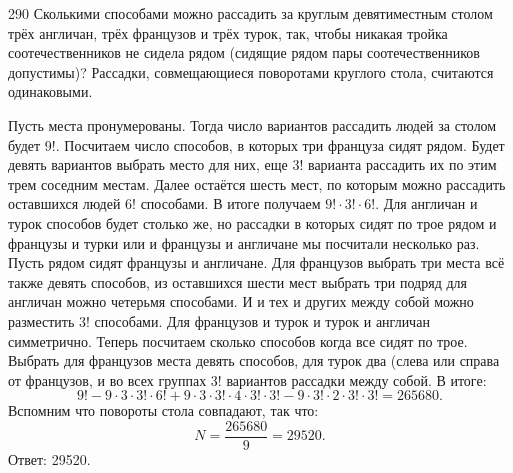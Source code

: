 \begin{task}{290}
    Сколькими способами можно рассадить за круглым девятиместным столом трёх англичан, трёх французов и трёх турок, так, чтобы никакая тройка соотечественников не сидела рядом (сидящие рядом пары соотечественников допустимы)? Рассадки, совмещающиеся поворотами круглого стола, считаются одинаковыми. 
\end{task}

\begin{solution}
	Пусть места пронумерованы. Тогда число вариантов рассадить людей за столом будет 9!. Посчитаем число способов, в которых три француза  сидят рядом. Будет девять вариантов выбрать место для них, еще 3! варианта рассадить их по этим трем соседним местам. Далее остаётся шесть мест, по которым можно рассадить оставшихся людей 6! способами. В итоге получаем \(9! \cdot 3! \cdot 6!\). Для англичан и турок способов будет столько же, но рассадки в которых сидят по трое рядом и французы и турки или и французы и англичане мы посчитали несколько раз. Пусть рядом сидят французы и англичане. Для французов выбрать три места всё также девять способов, из оставшихся шести мест выбрать три подряд для англичан можно четерьмя способами. И и тех и других между собой можно разместить 3! способами. Для французов и турок и турок и англичан симметрично. Теперь посчитаем сколько способов когда все сидят по трое. Выбрать для французов места девять способов, для турок два (слева или справа от французов, и во всех группах 3! вариантов рассадки между собой. В итоге:
	\[ 9! - 9 \cdot 3 \cdot 3! \cdot 6! + 9 \cdot 3 \cdot 3! \cdot 4 \cdot 3! \cdot 3! - 9 \cdot 3! \cdot 2 \cdot 3! \cdot 3! = 265680.\]
	Вспомним что повороты стола совпадают, так что:
	\[N = \frac{265680}{9} = 29520.\]
	Ответ: 29520.
\end{solution}